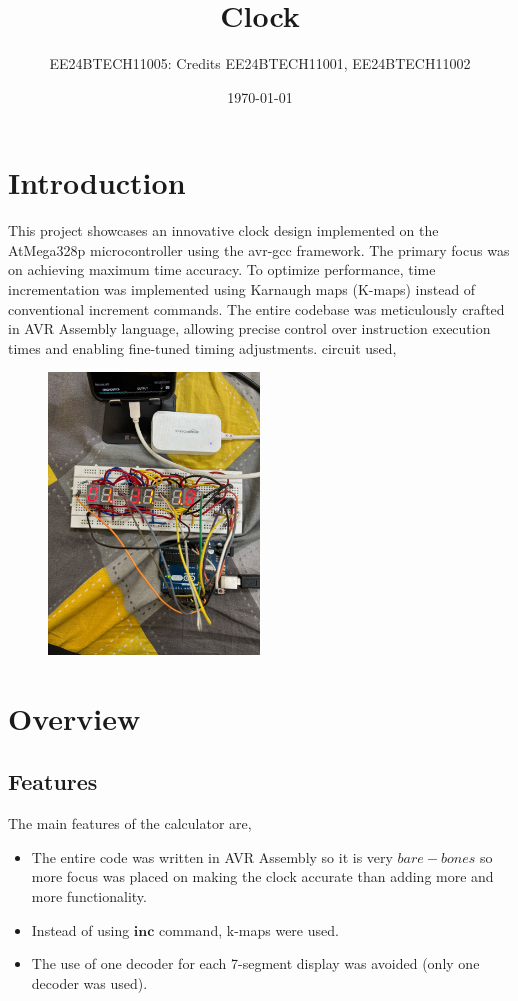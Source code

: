 \documentclass[a4paper,12pt]{article}
\title{Clock}
\author{EE24BTECH11005: Credits EE24BTECH11001, EE24BTECH11002}
\date{\today}
\begin{document}
\maketitle

\section*{Introduction}
This project showcases an innovative clock design implemented on the AtMega328p microcontroller using the avr-gcc framework. The primary focus was on achieving maximum time accuracy. To optimize performance, time incrementation was implemented using Karnaugh maps (K-maps) instead of conventional increment commands. The entire codebase was meticulously crafted in AVR Assembly language, allowing precise control over instruction execution times and enabling fine-tuned timing adjustments. \newline
circuit used,
\begin{figure}[h!]
  \begin{center}
    \includegraphics[width=0.5\textwidth]{figs/circuit.png}
  \end{center}
  \caption{}\label{fig:Circuit}
\end{figure}
\section*{Overview}
\subsection*{Features}
The main features of the calculator are,
\begin{itemize}
    \item The entire code was written in AVR Assembly so it is very $bare-bones$ so more focus was placed on making the clock accurate than adding more and more functionality.
    \item Instead of using $\mathbf{inc}$ command, k-maps were used. 
    \item The use of one decoder for each 7-segment display was avoided (only one decoder was used).

\end{itemize}
\end{document}
